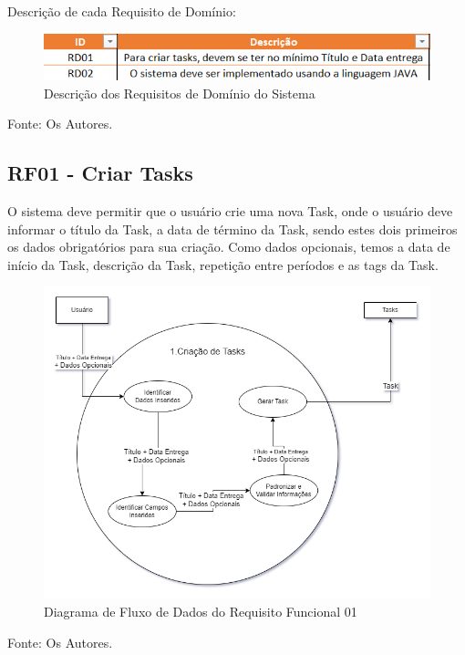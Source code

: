 \documentclass[a4paper,12pt]{article}
\begin{document}
Descrição de cada Requisito de Domínio:
\begin{figure}[H]
	\centering
	\includegraphics[scale=0.80]{requirements/domain/description.png}
	\caption{Descrição dos Requisitos de Domínio do Sistema}
\end{figure}
\noindent Fonte: Os Autores.

\pagebreak
\subsection{RF01 - Criar Tasks}
O sistema deve permitir que o usuário crie uma nova {Task}, onde o usuário deve informar o título da {Task}, a data 
de término da {Task}, sendo estes dois primeiros os dados obrigatórios para sua criação. Como dados opcionais, temos a 
data de início da {Task}, descrição da {Task}, repetição entre períodos e as tags da {Task}.
\begin{figure}[H]
	\centering
	\includegraphics[scale=0.45]{DFDs/RF01.drawio.png}
	\caption{Diagrama de Fluxo de Dados do Requisito Funcional 01}
\end{figure}
\noindent Fonte: Os Autores.

\pagebreak
\end{document}
